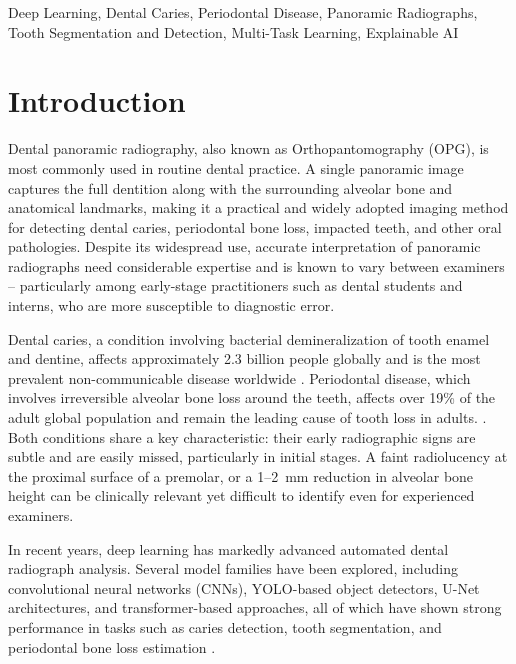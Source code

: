 \documentclass[conference]{IEEEtran}
\begin{document}
\begin{IEEEkeywords}
Deep Learning, Dental Caries, Periodontal Disease, Panoramic
Radiographs, Tooth Segmentation and Detection, Multi-Task Learning,
Explainable AI
\end{IEEEkeywords}

\section{Introduction}
\label{sec:intro}

Dental panoramic radiography, also known as Orthopantomography (OPG), is most commonly used in routine dental practice. A single panoramic image captures the full dentition along with the surrounding alveolar bone and anatomical landmarks, making  it a practical and widely adopted imaging method for detecting dental caries, periodontal bone loss, impacted teeth, and other oral pathologies. Despite its widespread use, accurate interpretation of panoramic radiographs need considerable expertise and is known to vary between examiners -- particularly among early-stage practitioners such as dental students and interns, who are more susceptible to diagnostic error.

Dental caries, a condition involving bacterial demineralization of tooth enamel and dentine, affects approximately 2.3 billion people globally and is the most prevalent non-communicable disease worldwide
\cite{luke2025accuracy}. Periodontal disease, which involves irreversible alveolar bone loss around the teeth, affects over 19\% of
the adult global population and remain the leading cause of tooth loss in adults.
\cite{khubrani2025detection}. Both conditions share a key characteristic: their early radiographic signs are subtle and are easily missed, particularly in initial stages. A faint radiolucency at the proximal surface of a premolar, or a
1--2\, mm reduction in alveolar bone height can be clinically relevant yet difficult to identify even for experienced examiners.

In recent years, deep learning has markedly advanced automated dental radiograph analysis. Several model families have been explored, including convolutional neural networks (CNNs), YOLO-based object detectors, U-Net architectures, and transformer-based approaches, all of which have shown strong performance in tasks such as caries detection, tooth segmentation, and periodontal bone loss estimation
\cite{nassiri2025yolo,jundaeng2025advanced,bhoopalan2026self}.
\end{document}
